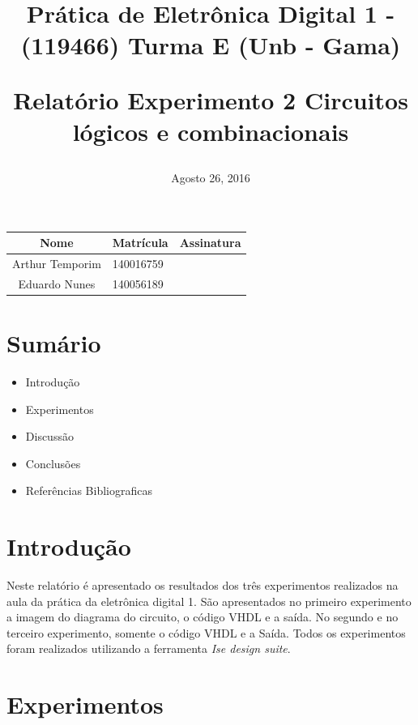 \documentclass[12pts]{article}
\title{
	Prática de Eletrônica Digital 1 - (119466)
	\singlespacing
		Turma E (Unb - Gama)
	\singlespacing
	\begin{midpage}
	\begin {large}
		Relatório Experimento 2
		\singlespace
		Circuitos lógicos e combinacionais
	\end {large}
	\end{midpage}
}
\date{Agosto 26, 2016}
\begin{document}
\maketitle	
\begin{center}

\begin{tabular}{|c|l|r|}
\hline
Nome & Matrícula & Assinatura\\
\hline
Arthur Temporim & 140016759 & \\
\hline	
Eduardo Nunes & 140056189 & \\
\hline	
\end{tabular}

\end{center}


\newpage

\section{Sumário}

\begin{itemize}
	\item Introdução
	\singlespacing
	\item Experimentos
	\singlespacing
	\item Discussão
	\singlespacing
	\item Conclusões 
	\singlespacing
	\item Referências Bibliograficas
	\singlespacing
\end{itemize}

\newpage


\section{Introdução}

	Neste relatório é apresentado os resultados dos três experimentos realizados na aula da prática da eletrônica digital 1.
	São apresentados no primeiro experimento a imagem do diagrama do circuito, o código VHDL e a saída. No segundo e no terceiro experimento, somente o código VHDL e a Saída. Todos os experimentos foram realizados utilizando a ferramenta \textit{Ise design suite}.

\section{Experimentos}

\end{document}
